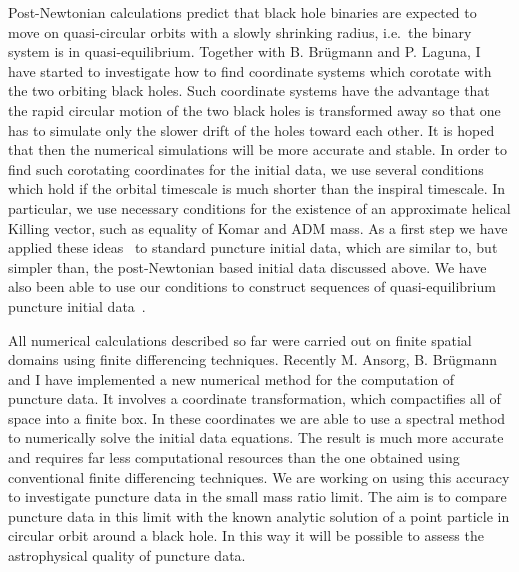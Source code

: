 \documentclass[11pt]{article}
\begin{document}
\begin{spacing}{0.95}
Post-Newtonian calculations predict that black hole binaries are expected to
move on quasi-circular orbits with a slowly shrinking radius, i.e.\ the
binary system is in quasi-equilibrium. Together with B. Br\"ugmann and P.
Laguna, I have started to investigate how to find coordinate systems which
corotate with the two orbiting black holes. Such coordinate systems have the
advantage that the rapid circular motion of the two black holes is
transformed away so that one has to simulate only the slower drift of the
holes toward each other. It is hoped that then the numerical simulations
will be more accurate and stable. 
In order to find such corotating coordinates
for the initial data, we use several conditions which hold if the orbital
timescale is much shorter than the inspiral timescale. In particular, we use
necessary conditions for the existence of an approximate helical Killing
vector, such as equality of Komar and ADM mass. As a first step we have
applied these ideas~\cite{Tichy03a} to standard puncture initial data, which
are similar to, but simpler than, the post-Newtonian based initial data
discussed above. We have also been able to use our conditions to construct
sequences of quasi-equilibrium puncture initial data~\cite{Tichy:2003qi}.



All numerical calculations described so far were carried out on finite
spatial domains using finite differencing techniques. Recently M. Ansorg, B.
Br\"ugmann and I have implemented a new numerical method for the computation
of puncture data. It involves a coordinate transformation, which
compactifies all of space into a finite box.
In these coordinates we are able to use a spectral method to
numerically solve the initial data equations. The result is much more
accurate and requires far less computational resources than the one
obtained using conventional finite differencing techniques.
We are working on using this accuracy to investigate puncture data in the
small mass ratio limit. The aim is to compare puncture data in this limit
with the known analytic solution of a point particle in circular orbit
around a black hole. In this way it will be possible to assess the 
astrophysical quality of puncture data.




\end{spacing}
\end{document}
